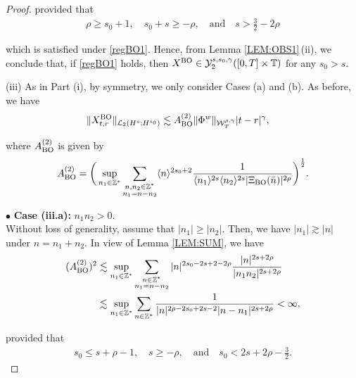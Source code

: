 \documentclass[letterpaper, 11pt,  reqno]{amsart}
\newcommand{\1}{\hspace{0.5mm}\text{I}\hspace{0.5mm}}
\newcommand{\noi}{\noindent}
\newcommand{\Z}{\mathbb{Z}}
\newcommand{\T}{\mathbb{T}}
\newcommand{\bul}{\bullet}
\newcommand{\g}{\gamma}
\newcommand{\les}{\lesssim}
\newcommand{\ges}{\gtrsim}
\newcommand{\jb}[1]
{\langle #1 \rangle}
\newcommand{\cL}{\mathcal{L}}
\newcommand{\cY}{\mathcal{Y}}
\newcommand{\W}{\mathcal{W}}
\newcommand{\BO}{\text{\rm BO} }
\numberwithin{equation}{section}
\numberwithin{theorem}{section}
\begin{document}
\begin{proof}
\noi
provided that 
\begin{align*}
\rho \ge s_0 + 1, \quad s_0 + s  \ge -  \rho, \quad
\text{and}\quad 
s > \frac 32 - 2 \rho
\end{align*}

\noi
which is satisfied under \eqref{regBO1}.
Hence,
from  Lemma \ref{LEM:OBS1}\,(ii),  
we conclude that, if \eqref{regBO1} holds, 
then
 $X^\BO\in  \cY^{s, s_0, \g}_2([0, T]\times \T)$
 for any $s_0 > s$.





\medskip

\noi
(iii) As in Part (i), 
by symmetry, 
we only consider Cases (a) and (b). 
As before, we have 
\begin{align*}
\|X^\BO_{t,r} \|_{\cL_2 ( H^s; H^{s_0})}
&\les
A^{(2)}_\BO \| \Phi^w \|_{\W_T^{\rho,\g}} 
  |t-r|^{\g},  
\end{align*}

\noi
where $A^{(2)}_\BO$ is given by
\begin{align}
A^{(2)}_\BO = \bigg(\sup_{n_1 \in \Z^*}
\sum_{\substack{n, n_2 \in \Z^*\\n_1 = n - n_2}}
 \jb{n}^{2{s_0} + 2}
 \frac{1}{\jb{n_1}^{2{s}} \jb{n_2}^{2s} |  \Xi_\BO (\bar n)|^{2\rho}}\bigg)^\frac 12.
\label{B8a}
\end{align}



\medskip

\noi
$\bul$ {\bf Case (iii.a):} $n_1 n_2 >0$.\\
\indent
Without loss of generality, assume that $|n_1|\ge |n_2|$.
Then, we have $|n_1|\ges |n|$ under $n = n_1 + n_2$.
In view of Lemma \ref{LEM:SUM}, we have 
\begin{align*}
(A_\BO^{(2)})^2
& \les 
 \sup_{n_1\in \Z^*}
 \sum_{\substack{n\in \Z^*\\n_1 = n - n_2}}  |n|^{2s_0 - 2s + 2-2\rho}
\frac{  |n|^{2s+2\rho}  }{  |n_1 n_2|^{2s+2\rho} }\\
& \les \sup_{n_1\in \Z^*}
\sum_{n\in \Z^*} 
\frac{1}{ |n|^{2\rho-2s_0 + 2s-2}
|n - n_1|^{2s+2\rho} }
< \infty, 
\end{align*}


\noi
provided that 
\begin{align}
s_0 \le s + \rho - 1, \quad  s \ge - \rho, \quad
\text{and}\quad 
s_0< 2s + 2\rho -\frac 32.
\label{B9}
\end{align}




\medskip


\end{proof}
\end{document}
